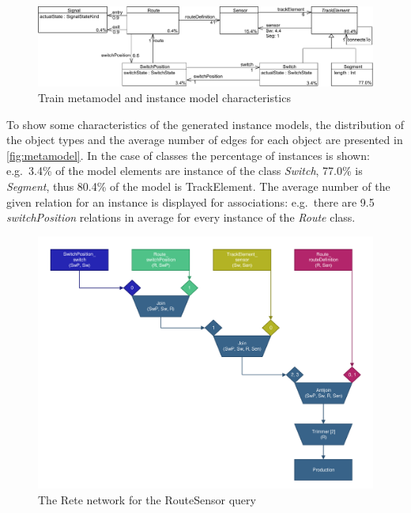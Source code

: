 \begin{figure}[Htb]
\begin{center}
\includegraphics[width=\textwidth]{figures/instance/TrainMMb.pdf}
\caption{Train metamodel and instance model characteristics}
\label{fig:metamodel-instance-characteristics}
\end{center}
\end{figure}

To show some characteristics of the generated instance models, the distribution of the object types and the average number of edges for each object are presented in \autoref{fig:metamodel}. In the case of classes the percentage of instances is shown: e.g.\ 3.4\% of the model elements are instance of the class \emph{Switch}, 77.0\% is \emph{Segment}, thus 80.4\% of the model is TrackElement. The average number of the given relation for an instance is displayed for associations: e.g.\ there are 9.5 \emph{switchPosition} relations in average for every instance of the \emph{Route} class.

\begin{figure}[Htb]
\begin{center}
\includegraphics[scale=0.5]{figures/rete-routesensor-layout.pdf}
\caption{The Rete network for the \textsf{RouteSensor} query} 
\label{fig:rete-routesensor-layout}
\end{center}
\end{figure}

